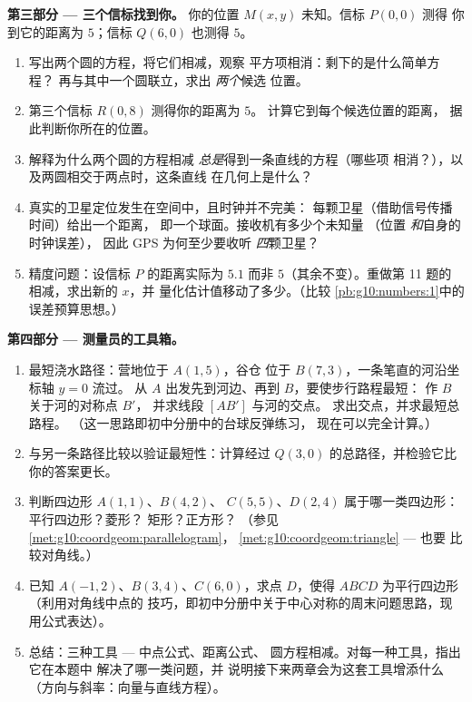 \begin{problem}
\medskip
\noindent\textbf{第三部分 --- 三个信标找到你。}
你的位置 $M(x, y)$ 未知。信标 $P(0, 0)$ 测得
你到它的距离为 $5$；信标 $Q(6, 0)$ 也测得 $5$。
\begin{enumerate}[resume]
  \item 写出两个圆的方程，将它们相减，观察
        平方项相消：剩下的是什么简单方程？
        再与其中一个圆联立，求出 \emph{两个}候选
        位置。
  \item 第三个信标 $R(0, 8)$ 测得你的距离为 $5$。
        计算它到每个候选位置的距离，
        据此判断你所在的位置。
  \item 解释为什么两个圆的方程相减
        \emph{总是}得到一条直线的方程（哪些项
        相消？），以及两圆相交于两点时，这条直线
        在几何上是什么？
  \item 真实的卫星定位发生在空间中，且时钟并不完美：
        每颗卫星（借助信号传播时间）给出一个距离，
        即一个球面。接收机有多少个未知量
        （位置 \emph{和}自身的时钟误差），
        因此 GPS 为何至少要收听
        \emph{四}颗卫星？
  \item 精度问题：设信标 $P$ 的距离实际为
        $5.1$ 而非 $5$（其余不变）。重做第 11 题的
        相减，求出新的 $x$，并
        量化估计值移动了多少。（比较
        \cref{pb:g10:numbers:1}中的误差预算思想。）
\end{enumerate}

\medskip
\noindent\textbf{第四部分 --- 测量员的工具箱。}
\begin{enumerate}[resume]
  \item 最短浇水路径：营地位于 $A(1, 5)$，谷仓
        位于 $B(7, 3)$，一条笔直的河沿坐标轴 $y = 0$ 流过。
        从 $A$ 出发先到河边、再到 $B$，要使步行路程最短：
        作 $B$ 关于河的对称点 $B'$，
        并求线段 $[AB']$ 与河的交点。
        求出交点，并求最短总路程。
        （这一思路即初中分册中的台球反弹练习，
        现在可以完全计算。）
  \item 与另一条路径比较以验证最短性：计算经过
        $Q(3, 0)$ 的总路径，并检验它比你的答案更长。
  \item 判断四边形 $A(1,1)$、$B(4,2)$、
        $C(5,5)$、$D(2,4)$ 属于哪一类四边形：平行四边形？菱形？
        矩形？正方形？
        （参见\cref{met:g10:coordgeom:parallelogram}，
        \cref{met:g10:coordgeom:triangle} --- 也要
        比较对角线。）
  \item 已知 $A(-1, 2)$、$B(3, 4)$、$C(6, 0)$，求点 $D$，使得
        $ABCD$ 为平行四边形（利用对角线中点的
        技巧，即初中分册中关于中心对称的周末问题思路，现用公式表达）。
  \item 总结：三种工具 --- 中点公式、距离公式、
        圆方程相减。对每一种工具，指出它在本题中
        解决了哪一类问题，并
        说明接下来两章会为这套工具增添什么
        （方向与斜率：向量与直线方程）。
\end{enumerate}
\end{problem}
